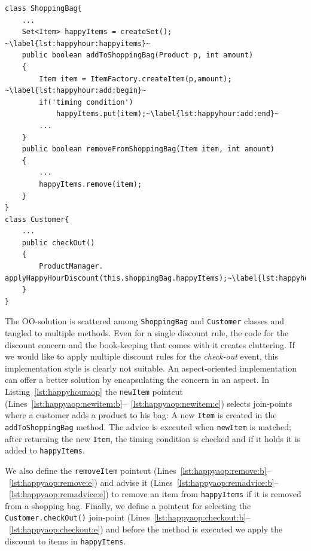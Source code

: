 \begin{lstlisting}[float, caption={A Java implementation of happy-hour discount rule}, label={lst:happyhour}]
class ShoppingBag{
	...
	Set<Item> happyItems = createSet(); ~\label{lst:happyhour:happyitems}~
	public boolean addToShoppingBag(Product p, int amount)
	{
		Item item = ItemFactory.createItem(p,amount); ~\label{lst:happyhour:add:begin}~
		if('timing condition')
			happyItems.put(item);~\label{lst:happyhour:add:end}~
		...
	}
	public boolean removeFromShoppingBag(Item item, int amount)
	{
		...
		happyItems.remove(item);
	}
}
class Customer{
	...
	public checkOut()
	{
		ProductManager. applyHappyHourDiscount(this.shoppingBag.happyItems);~\label{lst:happyhour:checkout}~
	}
}
\end{lstlisting}

The OO-solution is scattered among \lstinline{ShoppingBag} and \lstinline{Customer} classes and tangled to multiple methods. Even for a single discount rule, the code for the discount concern and the book-keeping that comes with it creates cluttering. If we would like to apply multiple discount rules for the \emph{check-out} event, this implementation style is clearly not suitable.
An aspect-oriented implementation can offer a better solution by encapsulating the concern in an aspect. In Listing~\ref{lst:happyhouraop} the \lstinline{newItem} pointcut (Lines~\ref{lst:happyaop:newitem:b}--~\ref{lst:happyaop:newitem:e}) selects join-points where a customer adds a product to his bag: A new \lstinline{Item} is created in the \lstinline{addToShoppingBag} method. The advice is executed when \lstinline{newItem} is matched; after returning the new \lstinline{Item}, the timing condition is checked and if it holds it is added to \lstinline{happyItems}. 

We also define the \lstinline{removeItem} pointcut (Lines~\ref{lst:happyaop:remove:b}--~\ref{lst:happyaop:remove:e}) and advise it (Lines~\ref{lst:happyaop:remadvice:b}--~\ref{lst:happyaop:remadvice:e}) to remove an item from \lstinline{happyItems} if it is removed from a shopping bag.
Finally, we define a pointcut for selecting the \lstinline{Customer.checkOut()} join-point (Lines~\ref{lst:happyaop:checkout:b}--~\ref{lst:happyaop:checkout:e}) and before the method is executed we apply the discount to items in \lstinline{happyItems}.

